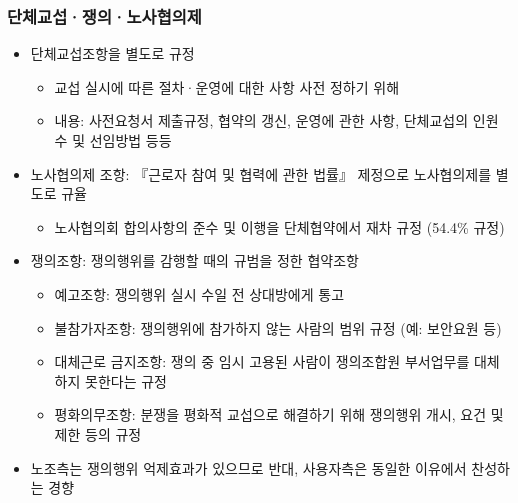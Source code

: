 \documentclass[aspectratio=169,xcolor=dvipsnames,handout]{beamer}
\begin{document}
\begin{frame}[allowframebreaks]
    \frametitle{단체교섭·쟁의·노사협의제}
    \begin{itemize}[<+->]
        \item 단체교섭조항을 별도로 규정
        \begin{itemize}[<+->]
            \item 교섭 실시에 따른 절차·운영에 대한 사항 사전 정하기 위해
            \item 내용: 사전요청서 제출규정, 협약의 갱신, 운영에 관한 사항, 단체교섭의 인원수 및 선임방법 등등
        \end{itemize}
        \item 노사협의제 조항: 『근로자 참여 및 협력에 관한 법률』 제정으로 노사협의제를 별도로 규율
        \begin{itemize}[<+->]
            \item 노사협의회 합의사항의 준수 및 이행을 단체협약에서 재차 규정 (54.4\% 규정)
        \end{itemize}
    \framebreak\relax
        \item 쟁의조항: 쟁의행위를 감행할 때의 규범을 정한 협약조항
        \begin{itemize}[<+->]
            \item 예고조항: 쟁의행위 실시 수일 전 상대방에게 통고
            \item 불참가자조항: 쟁의행위에 참가하지 않는 사람의 범위 규정 (예: 보안요원 등)
            \item 대체근로 금지조항: 쟁의 중 임시 고용된 사람이 쟁의조합원 부서업무를 대체하지 못한다는 규정
            \item 평화의무조항: 분쟁을 평화적 교섭으로 해결하기 위해 쟁의행위 개시, 요건 및 제한 등의 규정
        \end{itemize}
        \item 노조측는 쟁의행위 억제효과가 있으므로 반대, 사용자측은 동일한 이유에서 찬성하는 경향
    \end{itemize}
\end{frame}

\end{document}
